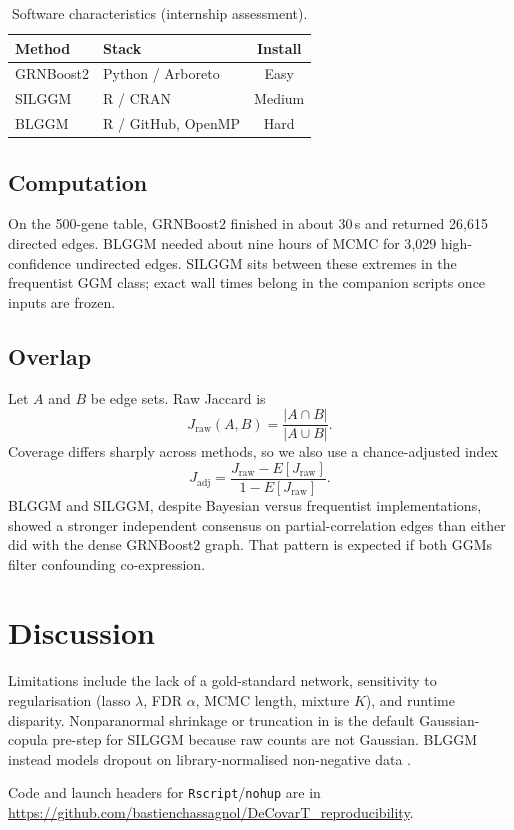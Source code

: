 \documentclass[sn-nature]{sn-jnl}
\begin{document}
\begin{table}[t]
\caption{Software characteristics (internship assessment).}
\label{tab:eng}
\begin{tabularx}{\columnwidth}{lXc}
\toprule
Method & Stack & Install \\
\midrule
GRNBoost2 & Python / Arboreto & Easy \\
SILGGM & R / CRAN & Medium \\
BLGGM & R / GitHub, OpenMP & Hard \\
\bottomrule
\end{tabularx}
\end{table}

\subsection{Computation}
On the 500-gene table, GRNBoost2 finished in about 30\,s and returned
26{,}615 directed edges. BLGGM needed about nine hours of MCMC for
3{,}029 high-confidence undirected edges. SILGGM sits between these
extremes in the frequentist GGM class; exact wall times belong in the
companion scripts once inputs are frozen.

\subsection{Overlap}
Let $A$ and $B$ be edge sets. Raw Jaccard is
\begin{equation}
J_{\mathrm{raw}}(A,B)=\frac{|A\cap B|}{|A\cup B|}.
\end{equation}
Coverage differs sharply across methods, so we also use a chance-adjusted
index
\begin{equation}
J_{\mathrm{adj}}=\frac{J_{\mathrm{raw}}-E[J_{\mathrm{raw}}]}{1-E[J_{\mathrm{raw}}]}.
\end{equation}
BLGGM and SILGGM, despite Bayesian versus frequentist implementations,
showed a stronger independent consensus on partial-correlation edges
than either did with the dense GRNBoost2 graph. That pattern is
expected if both GGMs filter confounding co-expression.

\section{Discussion}
\label{sec4}

Limitations include the lack of a gold-standard network, sensitivity to
regularisation (lasso $\lambda$, FDR $\alpha$, MCMC length, mixture
$K$), and runtime disparity. Nonparanormal shrinkage or truncation
\cite{liuNonparanormalSemiparametricEstimation2009} in
 \cite{R-huge} is the default Gaussian-copula pre-step for
SILGGM because raw counts are not Gaussian. BLGGM instead models dropout on
library-normalised non-negative data \cite{wuEstimatingHeterogeneousGene2022}.

Code and launch headers for \texttt{Rscript}/\texttt{nohup} are in
\url{https://github.com/bastienchassagnol/DeCovarT_reproducibility}.


\end{document}
